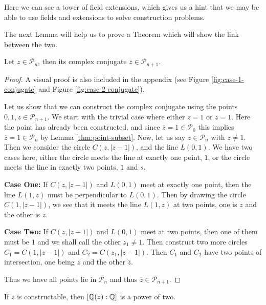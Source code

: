 Here we can see a tower of field extensions, which gives us a hint that we may be able to use fields and extensions to solve construction problems.

The next Lemma will help us to prove a Theorem which will show the link between the two.

\begin{lemma}\label{lemma:conjugate-in-Pn}
    Let $z \in \mathcal{P}_n$, then its complex conjugate $\overline{z} \in \mathcal{P}_{n+1}$.
\end{lemma}

\begin{proof}  
    A visual proof is also included in the appendix (see Figure \ref{fig:case-1-conjugate} and Figure \ref{fig:case-2-conjugate}).
    
    Let us show that we can construct the complex conjugate using the points $0, 1, z\in \mathcal{P}_{n+1}$.
    We start with the trivial case where either $z=1$ or $\overline{z}=1$. Here the point has already been constructed, and since $\overline{z}=1\in \mathcal{P}_0$ this implies $\overline{z}=1\in \mathcal{P}_n$ by Lemma \ref{thm:point-subset}.
\newline
\noindent
    Now, let us say $z\in \mathcal{P}_n$ with $z\neq1$. Then we consider the circle $C(z,|z-1|)$, and the line $L(0,1)$. We have two cases here, either the circle meets the line at exactly one point, $1$, or the circle meets the line in exactly two points, $1$ and $s$.

    \textbf{Case One:} If $C(z,|z-1|)$ and $L(0,1)$ meet at exactly one point, then the line $L(1,z)$ must be perpendicular to $L(0,1)$. Then by drawing the circle $C(1,|z-1|)$, we see that it meets the line $L(1,z)$ at two points, one is $z$ and the other is $\overline{z}$.

    \textbf{Case Two:} If $C(z,|z-1|)$ and $L(0,1)$ meet at two points, then one of them must be $1$ and we shall call the other $z_1\neq1$. Then construct two more circles $C_1=C(1,|z-1|)$ and $C_2=C(z_1,|z-1|)$. Then $C_1$ and $C_2$ have two points of intersection, one being $z$ and the other $\overline{z}$.

    Thus we have all points lie in $\mathcal{P}_n$ and thus $\overline{z} \in \mathcal{P}_{n+1}$.
\end{proof}

\begin{theorem}\label{thm:power-of-two-construction}
    If $z$ is constructable, then $[\mathbb Q(z):\mathbb Q]$ is a power of two.
\end{theorem}


